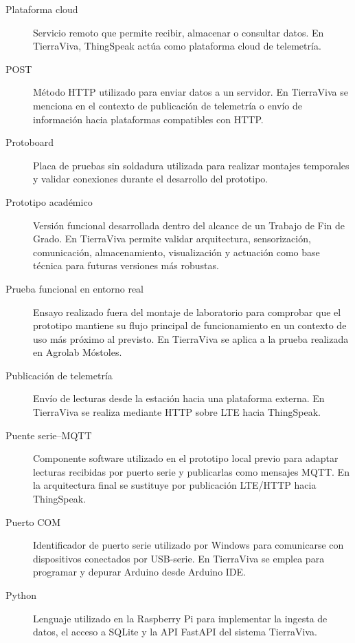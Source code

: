 \begin{description}
    \item[Plataforma cloud]
    Servicio remoto que permite recibir, almacenar o consultar datos. En TierraViva, ThingSpeak actúa como plataforma cloud de telemetría.

    \item[POST]
    Método HTTP utilizado para enviar datos a un servidor. En TierraViva se menciona en el contexto de publicación de telemetría o envío de información hacia plataformas compatibles con HTTP.

    \item[Protoboard]
    Placa de pruebas sin soldadura utilizada para realizar montajes temporales y validar conexiones durante el desarrollo del prototipo.

    \item[Prototipo académico]
    Versión funcional desarrollada dentro del alcance de un Trabajo de Fin de Grado. En TierraViva permite validar arquitectura, sensorización, comunicación, almacenamiento, visualización y actuación como base técnica para futuras versiones más robustas.

    \item[Prueba funcional en entorno real]
    Ensayo realizado fuera del montaje de laboratorio para comprobar que el prototipo mantiene su flujo principal de funcionamiento en un contexto de uso más próximo al previsto. En TierraViva se aplica a la prueba realizada en Agrolab Móstoles.

    \item[Publicación de telemetría]
    Envío de lecturas desde la estación hacia una plataforma externa. En TierraViva se realiza mediante HTTP sobre LTE hacia ThingSpeak.

    \item[Puente serie--MQTT]
    Componente software utilizado en el prototipo local previo para adaptar lecturas recibidas por puerto serie y publicarlas como mensajes MQTT. En la arquitectura final se sustituye por publicación LTE/HTTP hacia ThingSpeak.

    \item[Puerto COM]
    Identificador de puerto serie utilizado por Windows para comunicarse con dispositivos conectados por USB-serie. En TierraViva se emplea para programar y depurar Arduino desde Arduino IDE.

    \item[Python]
    Lenguaje utilizado en la Raspberry Pi para implementar la ingesta de datos, el acceso a SQLite y la API FastAPI del sistema TierraViva.


\end{description}
